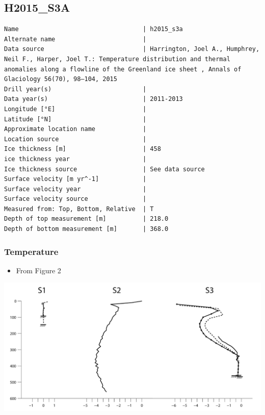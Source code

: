 \documentclass[article,a4paper,times,11pt,twoside]{article}
\begin{document}
\subsection{H2015\_S3A}
\label{sec:org28f6722}
\begin{verbatim}
Name                                  | h2015_s3a
Alternate name                        | 
Data source                           | Harrington, Joel A., Humphrey, Neil F., Harper, Joel T.: Temperature distribution and thermal anomalies along a flowline of the Greenland ice sheet , Annals of Glaciology 56(70), 98–104, 2015 
Drill year(s)                         | 
Data year(s)                          | 2011-2013
Longitude [°E]                        | 
Latitude [°N]                         | 
Approximate location name             | 
Location source                       | 
Ice thickness [m]                     | 458
ice thickness year                    | 
Ice thickness source                  | See data source
Surface velocity [m yr^-1]            | 
Surface velocity year                 | 
Surface velocity source               | 
Measured from: Top, Bottom, Relative  | T
Depth of top measurement [m]          | 218.0
Depth of bottom measurement [m]       | 368.0
\end{verbatim}

\subsubsection{Temperature}
\label{sec:org7ea48d3}

\begin{itemize}
\item From \textcite{harrington_2015} Figure 2
\end{itemize}

\begin{center}
\includegraphics[width=.9\linewidth]{h2015_s3a/harrington_2015_fig2_S1_S2_S3.png}
\end{center}
\end{document}
